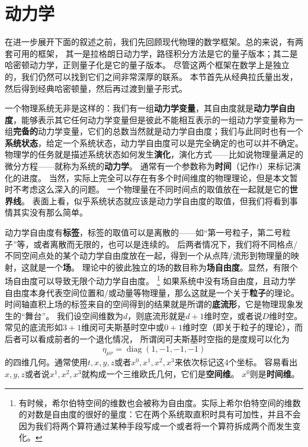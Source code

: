 \documentclass[UTF8, a4paper]{ctexart}
\DeclareMathOperator{\diag}{diag}
\begin{document}
\section{动力学}

在进一步展开下面的叙述之前，我们先回顾现代物理的数学框架。总的来说，有两套可用的框架，
其一是拉格朗日动力学，路径积分方法是它的量子版本；其二是哈密顿动力学，正则量子化是它的量子版本。
尽管这两个框架在数学上是独立的，我们仍然可以找到它们之间非常深厚的联系。
本节首先从经典拉氏量出发，然后得到经典哈密顿量，然后再过渡到量子形式。

一个物理系统无非是这样的：我们有一组\textbf{动力学变量}，其自由度就是\textbf{动力学自由度}，能够表示其它任何动力学变量但是彼此不能相互表示的一组动力学变量称为一组\textbf{完备的}动力学变量，它们的总数当然就是动力学自由度；我们与此同时也有一个\textbf{系统状态}，给定一个系统状态，动力学自由度可以是完全确定的也可以并不确定。
物理学的任务就是描述系统状态如何发生\textbf{演化}，演化方式——比如说物理量满足的微分方程——就称为系统的\textbf{动力学}。
通常有一个参数称为\textbf{时间}（记作$t$）来标记演化的进度。
当然，实际上完全可以存在有多个时间维度的物理理论，但是本文暂时不考虑这么深入的问题。
一个物理量在不同时间点的取值放在一起就是它的\textbf{世界线}。
表面上看，似乎系统状态就应该是动力学自由度的取值，但我们将看到事情其实没有那么简单。

动力学自由度有\textbf{标签}，标签的取值可以是离散的——如“第一号粒子，第二号粒子”等，或者离散而无限的，也可以是连续的。
后两者情况下，我们将不同格点/不同空间点处的某个动力学自由度放在一起，得到一个从点阵/流形到物理量的映射，这就是一个\textbf{场}。
理论中的彼此独立的场的数目称为\textbf{场自由度}。显然，有限个场自由度可以导致无限个动力学自由度。%
\footnote{有时候，希尔伯特空间的维数也会被称为自由度。实际上希尔伯特空间的维数的对数是自由度的很好的量度：它在两个系统取直积时具有可加性，并且不会因为我们将两个算符通过某种手段写成一个或者将一个算符拆成两个而发生变化。}%
如果系统中没有场自由度，且动力学自由度本身代表空间位置和/或动量等物理量，那么这就是一个关于\textbf{粒子}的理论。
时间轴直积上场的标签来自的空间得到的结果就是所谓的\textbf{底流形}，它是物理现象发生的“舞台”。
我们设空间维数为$d$，则底流形就是$d+1$维时空，或者说$D$维时空。
常见的底流形如$3+1$维闵可夫斯基时空中或$0+1$维时空（即关于粒子的理论），而后者可以看成前者的一个退化情况，
所谓闵可夫斯基时空指的是度规可以化为
\begin{equation}
    \eta_{\mu\nu} = \diag (1, -1, -1, -1)
\end{equation}
的四维几何。通常使用$t, x, y, z$或者$x^0, x^1, x^2, x^3$来依次标记这4个坐标。
容易看出$x, y, z$或者说$x^1, x^2, x^3$就构成一个三维欧氏几何，它们是\textbf{空间维}。
$x^0$则是\textbf{时间维}。
\end{document}
